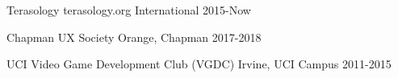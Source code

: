 

\begin{cvhonors}

  \cvhonor
    {Terasology} %
    {terasology.org} %
    {International} %
    {2015-Now } %

\cvhonor
{Chapman UX Society} %
{} %
{Orange, Chapman} %
{2017-2018} %


  \cvhonor
    {UCI Video Game Development Club (VGDC)} %
    {} %
    {Irvine, UCI Campus} %
    {2011-2015} %

\end{cvhonors}